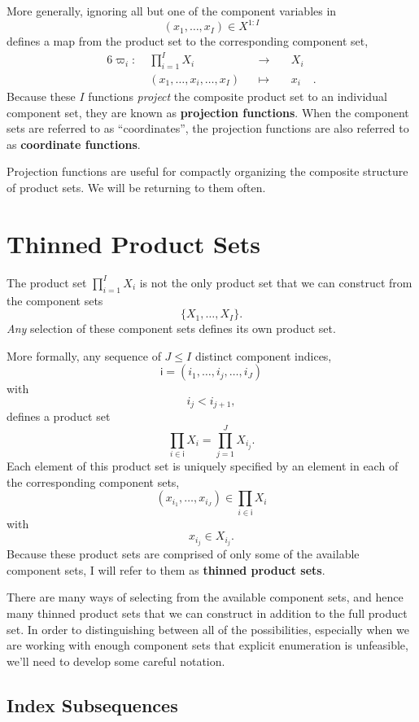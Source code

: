 \documentclass[
  letterpaper,
  DIV=11,
  numbers=noendperiod]{scrartcl}
\begin{document}
More generally, ignoring all but one of the component variables in \[
( x_{1}, \ldots, x_{I} ) \in X^{1:I}
\] defines a map from the product set to the corresponding component
set, \begin{alignat*}{6}
\varpi_{i} :\; & \prod_{i = 1}^{I} X_{i} & &\rightarrow& \; & X_{i} &
\\
& (x_{1}, \ldots, x_{i}, \ldots, x_{I}) & &\mapsto& & x_{i} &.
\end{alignat*} Because these \(I\) functions \emph{project} the
composite product set to an individual component set, they are known as
\textbf{projection functions}. When the component sets are referred to
as ``coordinates'', the projection functions are also referred to as
\textbf{coordinate functions}.

Projection functions are useful for compactly organizing the composite
structure of product sets. We will be returning to them often.

\section{Thinned Product Sets}\label{thinned-product-sets}

The product set \(\prod_{i = 1}^{I} X_{i}\) is not the only product set
that we can construct from the component sets \[
\{ X_{1}, \ldots, X_{I} \}.
\] \emph{Any} selection of these component sets defines its own product
set.

More formally, any sequence of \(J \le I\) distinct component indices,
\[
\mathsf{i} = ( i_{1}, \ldots, i_{j}, \ldots, i_{J} )
\] with \[
i_{j} < i_{j + 1},
\] defines a product set \[
\prod_{i \in \mathsf{i} } X_{i}
=
\prod_{j = 1}^{J} X_{i_{j}}.
\] Each element of this product set is uniquely specified by an element
in each of the corresponding component sets, \[
( x_{i_{1}}, \ldots, x_{i_{J}} )
\in
\prod_{i \in \mathsf{i} } X_{i}
\] with \[
x_{i_{j}} \in X_{i_{j}}.
\] Because these product sets are comprised of only some of the
available component sets, I will refer to them as \textbf{thinned
product sets}.

There are many ways of selecting from the available component sets, and
hence many thinned product sets that we can construct in addition to the
full product set. In order to distinguishing between all of the
possibilities, especially when we are working with enough component sets
that explicit enumeration is unfeasible, we'll need to develop some
careful notation.

\subsection{Index Subsequences}\label{index-subsequences}
\end{document}
